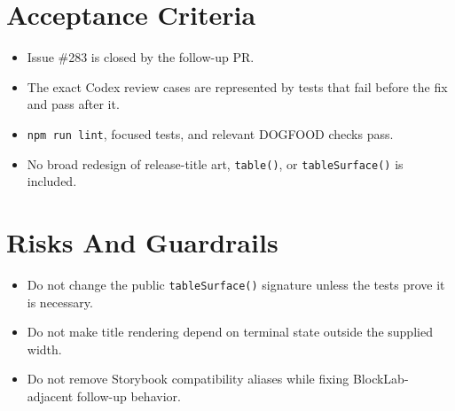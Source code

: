 \section{Acceptance Criteria}\label{record-136-acceptance-criteria}

\begin{itemize}
\tightlist
\item
  Issue \#283 is closed by the follow-up PR.
\item
  The exact Codex review cases are represented by tests that fail before the fix and pass after it.
\item
  \texttt{n\allowbreak{}p\allowbreak{}m\allowbreak{} \allowbreak{}r\allowbreak{}u\allowbreak{}n\allowbreak{} \allowbreak{}l\allowbreak{}i\allowbreak{}n\allowbreak{}t}, focused tests, and relevant DOGFOOD checks pass.
\item
  No broad redesign of release-title art, \texttt{t\allowbreak{}a\allowbreak{}b\allowbreak{}l\allowbreak{}e\allowbreak{}(\allowbreak{})}, or \texttt{t\allowbreak{}a\allowbreak{}b\allowbreak{}l\allowbreak{}e\allowbreak{}S\allowbreak{}u\allowbreak{}r\allowbreak{}f\allowbreak{}a\allowbreak{}c\allowbreak{}e\allowbreak{}(\allowbreak{})} is included.
\end{itemize}

\section{Risks And Guardrails}\label{record-136-risks-and-guardrails}

\begin{itemize}
\tightlist
\item
  Do not change the public \texttt{t\allowbreak{}a\allowbreak{}b\allowbreak{}l\allowbreak{}e\allowbreak{}S\allowbreak{}u\allowbreak{}r\allowbreak{}f\allowbreak{}a\allowbreak{}c\allowbreak{}e\allowbreak{}(\allowbreak{})} signature unless the tests prove it is necessary.
\item
  Do not make title rendering depend on terminal state outside the supplied width.
\item
  Do not remove Storybook compatibility aliases while fixing BlockLab-adjacent follow-up behavior.
\end{itemize}

